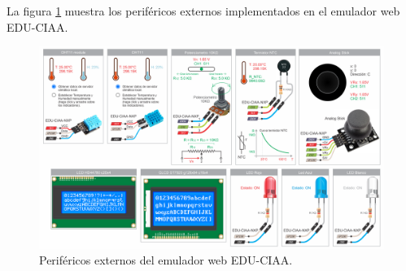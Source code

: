 La figura \ref{fig:perifericosCIAA} muestra los periféricos externos implementados en el emulador web EDU-CIAA.

\begin{figure}[ht]
	\centering
	\includegraphics[scale=.34]{./Figures/perifericosCIAA.png}
	\caption{Periféricos externos del emulador web EDU-CIAA.}
	\label{fig:perifericosCIAA}
\end{figure}

